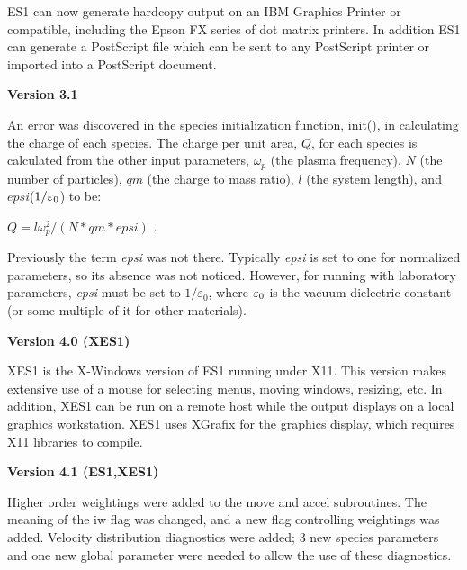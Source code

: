 \begin{section}
\begin{subsection}
\begin{subsubsection}
\noindent
      ES1 can now generate hardcopy output on an IBM Graphics Printer or
      compatible, including the Epson FX series of dot matrix printers.  In
      addition ES1 can generate a PostScript file which can be sent to any
      PostScript printer or imported into a PostScript document.
\end{subsubsection}

\begin{subsubsection}
{\bf Version 3.1}

      An error was discovered in the species initialization function, init(),
      in calculating the charge of each species.  The charge per unit
      area, $Q$,
      for each species is calculated from the other input parameters,
      $\omega_{p}$
      (the plasma frequency), $N$ (the number of particles),
      $qm$ (the charge to mass ratio), $l$ (the system length), and
      $epsi$($1/{\rm \varepsilon}_{0}$) to be:
\begin{center}
      $Q = l\omega_{p}^{2}/(N*qm*epsi)$ .
\end{center}
\noindent
      Previously the term {\em epsi} was not there.  Typically {\em epsi} 
      is set to one for
      normalized parameters, so its absence was not noticed.  However, for
      running with laboratory parameters, {\em epsi} must be set to
      $1 / \varepsilon_{0}$, where ${\rm \varepsilon}_{0}$ is the vacuum
      dielectric constant (or some multiple of it for other materials).
\end{subsubsection}

\begin{subsubsection}
{\bf Version 4.0 (XES1)}

      XES1 is the X-Windows version of ES1 running under X11.  This version
      makes extensive use of a mouse for selecting menus, moving windows,
      resizing, etc.  In addition, XES1 can be run on a remote host while the
      output displays on a local graphics workstation.  XES1 uses XGrafix for
      the graphics display, which requires X11 libraries to compile.
\end{subsubsection}
\begin{subsubsection}
{\bf Version 4.1 (ES1,XES1)}
\noindent

Higher order weightings were added to the move and accel subroutines.  The
meaning of the iw flag was changed, and a new flag controlling weightings was added.
Velocity distribution diagnostics were added; 3 new species parameters and one
new global parameter were needed to allow the use of these diagnostics.

\end{subsubsection}

\end{subsection}
\end{section}

